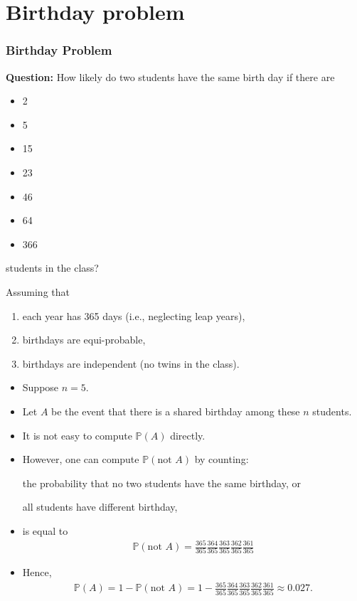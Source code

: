 \documentclass[9pt]{beamer}
\begin{document}
\section{Birthday problem}%
\begin{frame}[fragile,t] %
	\frametitle{Birthday Problem}
	{\bf Question:}
  How likely do two students have the same birth day if there are
	\begin{itemize}
		\item 2
		\item 5
		\item 15
		\item 23
		\item 46
		\item 64
		\item 366
	\end{itemize}
	students in the class?
  \vfill \pause

  Assuming that \pause
  \begin{enumerate}
    \item each year has 365 days (i.e., neglecting leap years),
    \item birthdays are equi-probable,
    \item birthdays are independent (no twins in the class).
  \end{enumerate}
\end{frame}
\begin{frame}[fragile,t] %
  \begin{itemize}
    \item Suppose $n=5$.
    \item Let $A$ be the event that there is a shared birthday among these $n$ students.
    \item It is not easy to compute $\mathbb{P}(A)$ directly.
    \item However, one can compute $\mathbb{P}\left(\text{not $A$}\right)$ by counting: \bigskip
      \begin{center}
        the probability that no two students have the same birthday, or\\
        \bigskip

				all students have different birthday,
			\end{center}
			\bigskip
		\item[] is equal to
			 \begin{align*}
         \mathbb{P}\left(\text{not $A$}\right) = \frac{365}{365} \frac{364}{365} \frac{363}{365} \frac{362}{365} \frac{361}{365}
			\end{align*}
	\item Hence,
		\begin{align*}
      \mathbb{P}(A) = 1 - \mathbb{P}\left(\text{not $A$}\right) = 1- \frac{365}{365} \frac{364}{365} \frac{363}{365} \frac{362}{365} \frac{361}{365}
			\approx 0.027.
		\end{align*}
	\end{itemize}
\end{frame}
\end{document}

